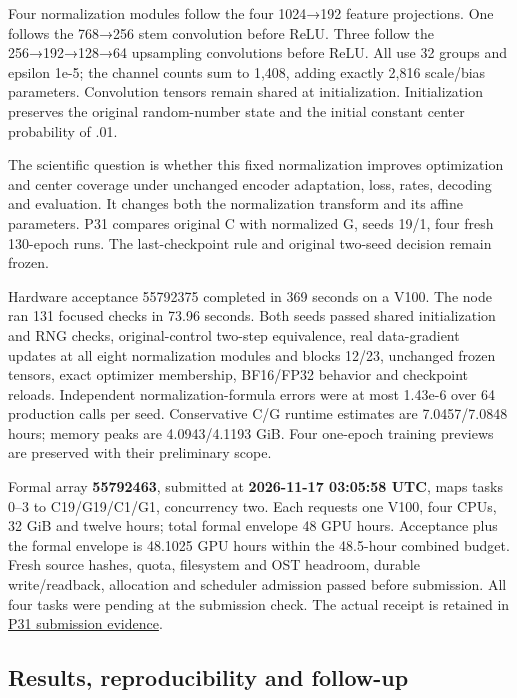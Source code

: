 \documentclass[
  11pt,
]{article}
\begin{document}
Four normalization modules follow the four 1024→192 feature projections.
One follows the 768→256 stem convolution before ReLU. Three follow the
256→192→128→64 upsampling convolutions before ReLU. All use 32 groups
and epsilon 1e-5; the channel counts sum to 1,408, adding exactly 2,816
scale/bias parameters. Convolution tensors remain shared at
initialization. Initialization preserves the original random-number
state and the initial constant center probability of .01.

The scientific question is whether this fixed normalization improves
optimization and center coverage under unchanged encoder adaptation,
loss, rates, decoding and evaluation. It changes both the normalization
transform and its affine parameters. P31 compares original C with
normalized G, seeds 19/1, four fresh 130-epoch runs. The last-checkpoint
rule and original two-seed decision remain frozen.

Hardware acceptance 55792375 completed in 369 seconds on a V100. The
node ran 131 focused checks in 73.96 seconds. Both seeds passed shared
initialization and RNG checks, original-control two-step equivalence,
real data-gradient updates at all eight normalization modules and blocks
12/23, unchanged frozen tensors, exact optimizer membership, BF16/FP32
behavior and checkpoint reloads. Independent normalization-formula
errors were at most 1.43e-6 over 64 production calls per seed.
Conservative C/G runtime estimates are 7.0457/7.0848 hours; memory peaks
are 4.0943/4.1193 GiB. Four one-epoch training previews are preserved
with their preliminary scope.

Formal array \textbf{55792463}, submitted at \textbf{2026-11-17 03:05:58
UTC}, maps tasks 0--3 to C19/G19/C1/G1, concurrency two. Each requests
one V100, four CPUs, 32 GiB and twelve hours; total formal envelope 48
GPU hours. Acceptance plus the formal envelope is 48.1025 GPU hours
within the 48.5-hour combined budget. Fresh source hashes, quota,
filesystem and OST headroom, durable write/readback, allocation and
scheduler admission passed before submission. All four tasks were
pending at the submission check. The actual receipt is retained in
\href{../p31_submission_receipt.json}{P31 submission evidence}.

\subsection{Results, reproducibility and
follow-up}\label{results-reproducibility-and-follow-up}
\end{document}
